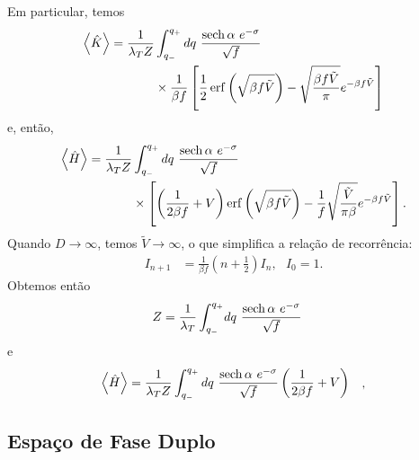 \documentclass[
	12pt,
	oneside,			%
	a4paper,			%
	english,			%
	brazil				%
	]{abntex2}
\theoremstyle{definition}
\begin{document}
Em particular, temos
\begin{equation}
    \begin{aligned}
        \expval{\hat{K}} = \frac{1}{\lambda_T Z} &  \int_{q_-}^{q_+}  dq \ \frac{\sech{\alpha} \  e^{-\sigma}}{\sqrt{f}} \\ &\times \frac{1}{\beta f  } \left[ \frac{1}{2} \erf \left( \sqrt{\beta f \Tilde{V}} \right) - \sqrt{\frac{\beta f \Tilde{V}}{\pi}} e^{-\beta f\Tilde{V}} \right]
    \end{aligned}
\end{equation}
e, então,
\begin{equation}
    \begin{aligned}
        \expval{\hat{H}} = \frac{1}{\lambda_T Z} &  \int_{q_-}^{q_+}  dq \  \frac{\sech{\alpha} \  e^{-\sigma}}{\sqrt{f}} \\ &\times  \left[ \left( \frac{1}{2\beta f} + V \right) \erf \left( \sqrt{\beta f \Tilde{V}} \right) -\frac{1}{f}\sqrt{\frac{\Tilde{V}}{\pi \beta }} e^{-\beta f\Tilde{V}} \right].
    \end{aligned}
\end{equation}
Quando $D \to \infty$, temos $\tilde{V} \to \infty$, o que simplifica a relação de recorrência:
\begin{equation}
    \begin{aligned}
        I_{n+1} &= \frac{1}{\beta f} \left(n + \frac{1}{2} \right)I_{n}, \ \ \ I_0 = 1.
    \end{aligned}
\end{equation}
Obtemos então
\begin{equation}
    \begin{aligned}
        Z = \frac{1}{\lambda_T}\int_{q_-}^{q_+} & dq \ \frac{\sech{\alpha} \  e^{-\sigma}}{\sqrt{f}}
    \end{aligned}
\end{equation}
e
\begin{equation}
    \begin{aligned}
        \expval{\hat{H}} =  \frac{1}{\lambda_T Z} & \int_{q_-}^{q_+}  dq \ \frac{\sech{\alpha} \  e^{-\sigma}}{\sqrt{f}} \left( \frac{1}{2\beta f} + V \right)
    \end{aligned},
\end{equation}


\subsection{Espaço de Fase Duplo}
\end{document}
